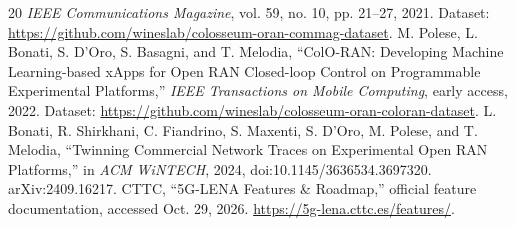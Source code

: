\documentclass[10pt,twocolumn]{article}
\begin{document}
\begin{thebibliography}{20}
\emph{IEEE Communications Magazine}, vol. 59, no. 10, pp. 21--27, 2021.
Dataset: \url{https://github.com/wineslab/colosseum-oran-commag-dataset}.
 M. Polese, L. Bonati, S. D'Oro, S. Basagni, and T. Melodia,
``ColO-RAN: Developing Machine Learning-based xApps for Open RAN Closed-loop
Control on Programmable Experimental Platforms,'' \emph{IEEE Transactions on
Mobile Computing}, early access, 2022.
Dataset: \url{https://github.com/wineslab/colosseum-oran-coloran-dataset}.
 L. Bonati, R. Shirkhani, C. Fiandrino, S. Maxenti,
S. D'Oro, M. Polese, and T. Melodia, ``Twinning Commercial Network Traces on
Experimental Open RAN Platforms,'' in \emph{ACM WiNTECH}, 2024,
doi:10.1145/3636534.3697320. arXiv:2409.16217.
 CTTC, ``5G-LENA Features \& Roadmap,'' official feature
documentation, accessed Oct. 29, 2026. \url{https://5g-lena.cttc.es/features/}.
\end{thebibliography}
\end{document}
